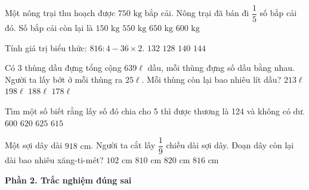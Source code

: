\begin{ex} %
Một nông trại thu hoạch được $750\text{ kg}$ bắp cải. Nông trại đã bán đi $\dfrac{1}{5}$ số bắp cải đó. Số bắp cải còn lại là
\choice
{$150\text{ kg}$}
{$550\text{ kg}$}
{$650\text{ kg}$}
{\True $600\text{ kg}$}
\end{ex}

\begin{ex} %
Tính giá trị biểu thức: $816 : 4 - 36 \times 2$.
\choice
{\True $132$}
{$128$}
{$140$}
{$144$}
\end{ex}

\begin{ex} %
Có 3 thùng dầu đựng tổng cộng $639\ell$ dầu, mỗi thùng đựng số dầu bằng nhau. Người ta lấy bớt ở mỗi thùng ra $25\ell$. Mỗi thùng còn lại bao nhiêu lít dầu?
\choice
{$213\ell$}
{$198\ell$}
{\True $188\ell$}
{$178\ell$}
\end{ex}

\begin{ex} %
Tìm một số biết rằng lấy số đó chia cho 5 thì được thương là 124 và không có dư.
\choice
{$600$}
{\True $620$}
{$625$}
{$615$}
\end{ex}

\begin{ex} %
Một sợi dây dài $918\text{ cm}$. Người ta cắt lấy $\dfrac{1}{9}$ chiều dài sợi dây. Đoạn dây còn lại dài bao nhiêu xăng-ti-mét?
\choice
{$102\text{ cm}$}
{$810\text{ cm}$}
{$820\text{ cm}$}
{\True $816\text{ cm}$}
\end{ex}

\textbf{Phần 2. Trắc nghiệm đúng sai}

